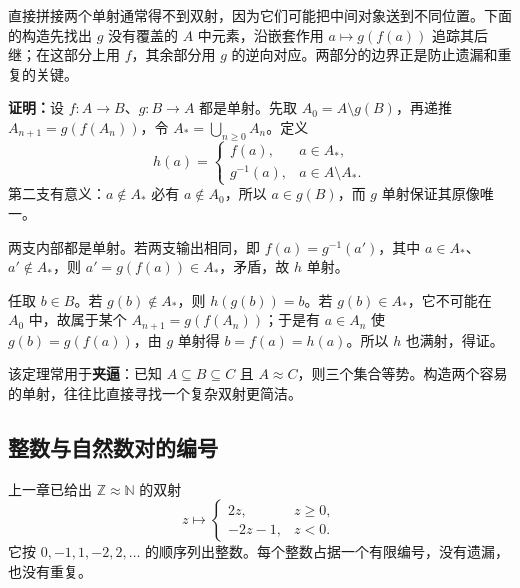 \documentclass[UTF8,fontset=none,zihao=-4,a4paper]{ctexart}
\newcommand{\term}[1]{\textbf{#1}}
\begin{document}
直接拼接两个单射通常得不到双射，因为它们可能把中间对象送到不同位置。下面的构造先找出 $g$ 没有覆盖的 $A$ 中元素，沿嵌套作用 $a\mapsto g(f(a))$ 追踪其后继；在这部分上用 $f$，其余部分用 $g$ 的逆向对应。两部分的边界正是防止遗漏和重复的关键。

\term{证明：}设 $f:A\to B$、$g:B\to A$ 都是单射。先取 $A_0=A\setminus g(B)$，再递推 $A_{n+1}=g(f(A_n))$，令 $A_*=\bigcup_{n\ge0}A_n$。定义
\[
h(a)=\begin{cases}
f(a),&a\in A_*,\\
g^{-1}(a),&a\in A\setminus A_*.
\end{cases}
\]
第二支有意义：$a\notin A_*$ 必有 $a\notin A_0$，所以 $a\in g(B)$，而 $g$ 单射保证其原像唯一。

两支内部都是单射。若两支输出相同，即 $f(a)=g^{-1}(a')$，其中 $a\in A_*$、$a'\notin A_*$，则 $a'=g(f(a))\in A_*$，矛盾，故 $h$ 单射。

任取 $b\in B$。若 $g(b)\notin A_*$，则 $h(g(b))=b$。若 $g(b)\in A_*$，它不可能在 $A_0$ 中，故属于某个 $A_{n+1}=g(f(A_n))$；于是有 $a\in A_n$ 使 $g(b)=g(f(a))$，由 $g$ 单射得 $b=f(a)=h(a)$。所以 $h$ 也满射，得证。

该定理常用于\term{夹逼}：已知 $A\subseteq B\subseteq C$ 且 $A\approx C$，则三个集合等势。构造两个容易的单射，往往比直接寻找一个复杂双射更简洁。

\subsection{整数与自然数对的编号}
上一章已给出 $\mathbb Z\approx\mathbb N$ 的双射
\[
z\longmapsto\begin{cases}2z,&z\ge0,\\-2z-1,&z<0.\end{cases}
\]
它按 $0,-1,1,-2,2,\ldots$ 的顺序列出整数。每个整数占据一个有限编号，没有遗漏，也没有重复。
\end{document}

